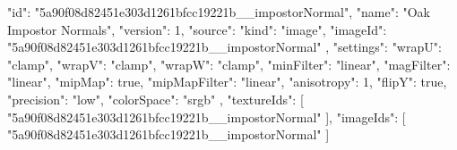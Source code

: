 {
  "id": "5a90f08d82451e303d1261bfcc19221b__impostorNormal",
  "name": "Oak Impostor Normals",
  "version": 1,
  "source": {
    "kind": "image",
    "imageId": "5a90f08d82451e303d1261bfcc19221b__impostorNormal"
  },
  "settings": {
    "wrapU": "clamp",
    "wrapV": "clamp",
    "wrapW": "clamp",
    "minFilter": "linear",
    "magFilter": "linear",
    "mipMap": true,
    "mipMapFilter": "linear",
    "anisotropy": 1,
    "flipY": true,
    "precision": "low",
    "colorSpace": "srgb"
  },
  "textureIds": [
    "5a90f08d82451e303d1261bfcc19221b__impostorNormal"
  ],
  "imageIds": [
    "5a90f08d82451e303d1261bfcc19221b__impostorNormal"
  ]
}
